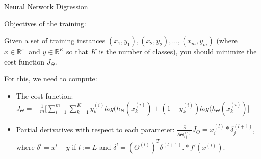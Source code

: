 \documentclass{beamer}
\begin{document}
\begin{frame}{Neural Network Digression}
\begin{minipage}[t]{0.5\linewidth}
\begin{center}
        \end{center}
        \vfill{}
      \end{minipage}
      \begin{minipage}[t]{0.48\linewidth}
        \scriptsize

         {
          Objectives of the training:

          Given a set of training instances ${(x_1, y_1), (x_2, y_2), \ldots,
            (x_m, y_m)}$ (where $x \in \mathbb{R}^{s_0}$ and $y \in
          \mathbb{R}^{K}$ so that $K$ is the number of classes), you should
          minimize the cost function $J_\Theta$.\\[0.2cm]
        }

         {
          For this, we need to compute:
          \begin{itemize}
            \item The cost function:
              $J_\Theta =
            -\frac{1}{m}\Big[\sum_{i=1}^{m}\sum_{k=1}^{K}y_k^{(i)}log(h_\Theta(x^(i)_k)
              + (1 - y_k^{(i)})log(h_\Theta(x^(i)_k)\Big]$

            \item Partial derivatives with respect to each parameter:
              $\frac{\partial}{\partial \Theta^{(l)}_{ij}} J_\Theta =
              x^{(l)}_i * \delta_j^{(l+1)}$, where $\delta^l = x^l - y$ if $l
              := L$ and $\delta^l = (\Theta^{(l)})^T\delta^{(l + 1)} .*
              f\prime(x^{(l)})$.
          \end{itemize}
        }
      \end{minipage}
      \vspace*{\fill}
    \end{frame}
\end{document}

